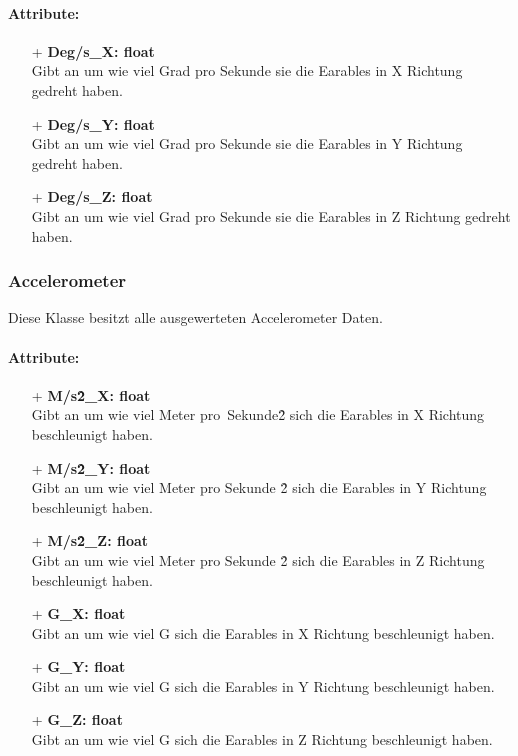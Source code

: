 \documentclass[a4paper,12pt]{article}
\begin{document}
\paragraph{Attribute:}
\begin{itemize}
	\item[+] \textbf{Deg/s\_X: float}\\Gibt an um wie viel Grad pro Sekunde sie die Earables in X Richtung gedreht haben.
	\item[+] \textbf{Deg/s\_Y: float}\\Gibt an um wie viel Grad pro Sekunde sie die Earables in Y Richtung gedreht haben.
	\item[+] \textbf{Deg/s\_Z: float}\\Gibt an um wie viel Grad pro Sekunde sie die Earables in Z Richtung gedreht haben.
\end{itemize}


\subsubsection{Accelerometer}
Diese Klasse besitzt alle ausgewerteten Accelerometer Daten.

\paragraph{Attribute:}
\begin{itemize}
	\item[+] \textbf{M/s\^2\_X: float}\\Gibt an um wie viel Meter pro\ Sekunde\^2 sich die Earables in X Richtung beschleunigt haben.
	\item[+] \textbf{M/s\^2\_Y: float}\\Gibt an um wie viel Meter pro Sekunde \^2 sich die Earables in Y Richtung beschleunigt haben.
	\item[+] \textbf{M/s\^2\_Z: float}\\Gibt an um wie viel Meter pro Sekunde \^2 sich die Earables in Z Richtung beschleunigt haben.
	\item[+] \textbf{G\_X: float}\\Gibt an um wie viel G sich die Earables in X Richtung beschleunigt haben.
	\item[+] \textbf{G\_Y: float}\\Gibt an um wie viel G sich die Earables in Y Richtung beschleunigt haben.
	\item[+] \textbf{G\_Z: float}\\Gibt an um wie viel G sich die Earables in Z Richtung beschleunigt haben.
\end{itemize}
\end{document}
